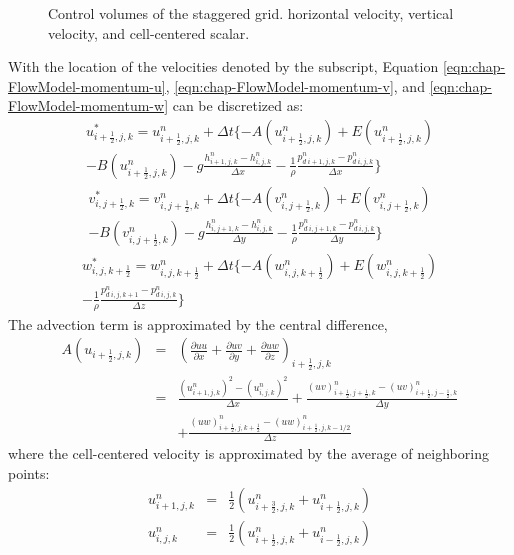 \begin{figure}[htbp]
\label{fig:Staggered-CV-u}
\caption{Control volumes of the staggered grid. horizontal velocity, vertical velocity, and cell-centered scalar.}
\end{figure}
With the location of the velocities denoted by the subscript, Equation \ref{eqn:chap-FlowModel-momentum-u}, \ref{eqn:chap-FlowModel-momentum-v}, and \ref{eqn:chap-FlowModel-momentum-w} can be discretized as:
\begin {eqnarray}
u_{i+ \frac{1}{2},j,k}^{*} = u_{i+ \frac{1}{2},j,k}^{n}+ \Delta t
\{ -A(u_{i+ \frac{1}{2},j,k}^n)+E(u_{i+ \frac{1}{2},j,k}^n) \nonumber \\
-B(u_{i+
\frac{1}{2},j,k}^n)-g\frac{h_{i+1,j,k}^n-h_{i,j,k}^n}{\Delta x}
-\frac{1}{\rho}\frac{p_{d \ i+1,j,k}^n-p_{d \ i,j,k}^n}{ \Delta x}
\}
\end{eqnarray}
\begin {eqnarray}
v_{i,j+ \frac{1}{2},k}^{*} = v_{i,j+ \frac{1}{2},k}^{n}+ \Delta t
\{ -A(v_{i,j+ \frac{1}{2},k}^n)+E(v_{i,j+ \frac{1}{2},k}^n) \nonumber \\
-B(v_{i,j+
\frac{1}{2},k}^n)-g\frac{h_{i,j+1,k}^n-h_{i,j,k}^n}{\Delta y}
-\frac{1}{\rho}\frac{p_{d \ i,j+1,k}^n-p_{d \ i,j,k}^n}{ \Delta y}
\}
\end{eqnarray}
\begin {eqnarray}
w_{i,j,k+ \frac{1}{2}}^{*} = w_{i,j,k+ \frac{1}{2}}^{n}+ \Delta t
\{ -A(w_{i,j,k+ \frac{1}{2}}^n)+E(w_{i,j,k+ \frac{1}{2}}^n) \nonumber \\
-\frac{1}{\rho}\frac{p_{d \ i,j,k+1}^n-p_{d \ i,j,k}^n}{ \Delta z}
\}
\end{eqnarray}
The advection term is approximated by the central difference,
\begin{eqnarray}
A(u_{i+ \frac{1}{2} ,j,k})&=&( \frac{\partial uu}{\partial x} +  \frac{\partial
uv}{\partial y}+\frac{\partial uw}{\partial z})_{i+ \frac{1}{2} ,j, k}\nonumber\\
&=&\frac{(u^n_{i+1,j,k})^2-(u^n_{i,j,k})^2}{\Delta
x}+\frac{(uv)^n_{i+ \frac{1}{2} ,j+ \frac{1}{2} ,k}-(uv)^n_{i+
\frac{1}{2} ,j- \frac{1}{2} ,k}}{\Delta
y}\nonumber \\
& & + \frac{(uw)^n_{i+ \frac{1}{2} ,j,k + \frac{1}{2}} -(uw)^n_{i+
\frac{1}{2} ,j,k-1/2}}{\Delta z}
\end{eqnarray}
where the cell-centered velocity is approximated by the average of
neighboring points:
\begin{eqnarray*}
u^n_{i+1,j,k}&=&\frac{1}{2}(u^n_{i + \frac{3}{2},j,k}+u^n_{i+ \frac{1}{2} ,j,k})\\
u^n_{i,j,k}&=&\frac{1}{2}(u^n_{i+ \frac{1}{2} ,j,k}+u^n_{i-
\frac{1}{2} ,j,k})
\end{eqnarray*}
